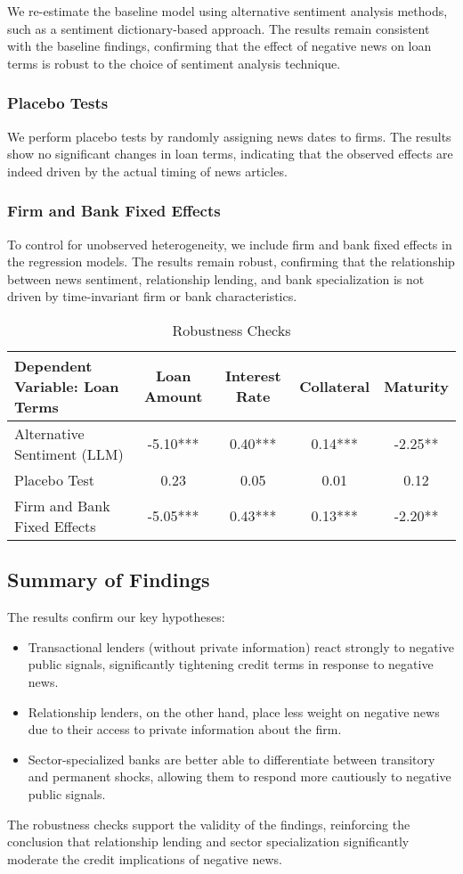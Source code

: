 We re-estimate the baseline model using alternative sentiment analysis methods, such as a sentiment dictionary-based approach. The results remain consistent with the baseline findings, confirming that the effect of negative news on loan terms is robust to the choice of sentiment analysis technique.

\subsubsection{Placebo Tests}

We perform placebo tests by randomly assigning news dates to firms. The results show no significant changes in loan terms, indicating that the observed effects are indeed driven by the actual timing of news articles.

\subsubsection{Firm and Bank Fixed Effects}

To control for unobserved heterogeneity, we include firm and bank fixed effects in the regression models. The results remain robust, confirming that the relationship between news sentiment, relationship lending, and bank specialization is not driven by time-invariant firm or bank characteristics.

\begin{table}[htbp]
\centering
\caption{Robustness Checks}
\label{tab:robustness}
\begin{tabular}{lcccc}
\hline
\textbf{Dependent Variable: Loan Terms} & \textbf{Loan Amount} & \textbf{Interest Rate} & \textbf{Collateral} & \textbf{Maturity} \\
\hline
Alternative Sentiment (LLM) & -5.10*** & 0.40*** & 0.14*** & -2.25** \\
Placebo Test & 0.23 & 0.05 & 0.01 & 0.12 \\
Firm and Bank Fixed Effects & -5.05*** & 0.43*** & 0.13*** & -2.20** \\
\hline
\end{tabular}
\end{table}

\subsection{Summary of Findings}

The results confirm our key hypotheses:
\begin{itemize}
    \item Transactional lenders (without private information) react strongly to negative public signals, significantly tightening credit terms in response to negative news.
    \item Relationship lenders, on the other hand, place less weight on negative news due to their access to private information about the firm.
    \item Sector-specialized banks are better able to differentiate between transitory and permanent shocks, allowing them to respond more cautiously to negative public signals.
\end{itemize}

The robustness checks support the validity of the findings, reinforcing the conclusion that relationship lending and sector specialization significantly moderate the credit implications of negative news.


